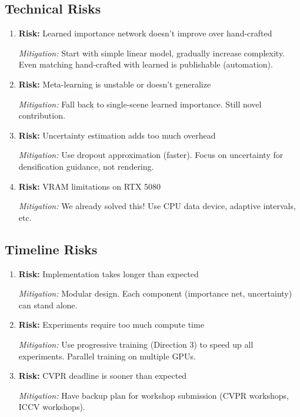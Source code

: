 \documentclass[11pt,letterpaper]{article}
\begin{document}
\subsection{Technical Risks}

\begin{enumerate}[leftmargin=*]
    \item \textbf{Risk:} Learned importance network doesn't improve over hand-crafted

    \textit{Mitigation:} Start with simple linear model, gradually increase complexity. Even matching hand-crafted with learned is publishable (automation).

    \item \textbf{Risk:} Meta-learning is unstable or doesn't generalize

    \textit{Mitigation:} Fall back to single-scene learned importance. Still novel contribution.

    \item \textbf{Risk:} Uncertainty estimation adds too much overhead

    \textit{Mitigation:} Use dropout approximation (faster). Focus on uncertainty for densification guidance, not rendering.

    \item \textbf{Risk:} VRAM limitations on RTX 5080

    \textit{Mitigation:} We already solved this! Use CPU data device, adaptive intervals, etc.
\end{enumerate}

\subsection{Timeline Risks}

\begin{enumerate}[leftmargin=*]
    \item \textbf{Risk:} Implementation takes longer than expected

    \textit{Mitigation:} Modular design. Each component (importance net, uncertainty) can stand alone.

    \item \textbf{Risk:} Experiments require too much compute time

    \textit{Mitigation:} Use progressive training (Direction 3) to speed up all experiments. Parallel training on multiple GPUs.

    \item \textbf{Risk:} CVPR deadline is sooner than expected

    \textit{Mitigation:} Have backup plan for workshop submission (CVPR workshops, ICCV workshops).
\end{enumerate}
\end{document}
